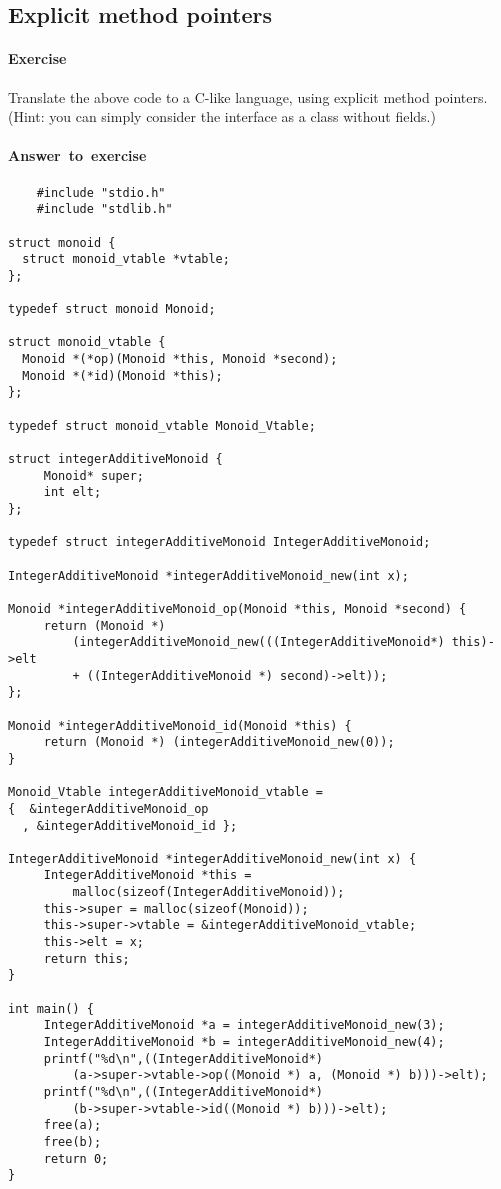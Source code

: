 \documentclass{article}
\newcommand{\percents}[1]{\protect \marginpar[l]{\bf [#1]}}
\newcounter{question}
\newcommand{\question}[1]{
  \addtocounter{question}{1}
  \paragraph{Exercise~\arabic{question}  \percents{#1}}
 }
\newenvironment{ans}{\begin{framed}\paragraph{Answer~to~exercise~\arabic{question}}}{\end{framed}}
\begin{document}
\subsection{Explicit method pointers}

\question{*,@2} Translate the above code to a C-like language, using
explicit method pointers. (Hint: you can simply consider the interface
as a class without fields.)

\begin{ans}
  \begin{verbatim}
    #include "stdio.h"
    #include "stdlib.h"

struct monoid {
  struct monoid_vtable *vtable;
};

typedef struct monoid Monoid;

struct monoid_vtable {
  Monoid *(*op)(Monoid *this, Monoid *second);
  Monoid *(*id)(Monoid *this);
};

typedef struct monoid_vtable Monoid_Vtable;

struct integerAdditiveMonoid {
     Monoid* super;
     int elt;
};

typedef struct integerAdditiveMonoid IntegerAdditiveMonoid;

IntegerAdditiveMonoid *integerAdditiveMonoid_new(int x);

Monoid *integerAdditiveMonoid_op(Monoid *this, Monoid *second) {
     return (Monoid *)
         (integerAdditiveMonoid_new(((IntegerAdditiveMonoid*) this)->elt
         + ((IntegerAdditiveMonoid *) second)->elt));
};

Monoid *integerAdditiveMonoid_id(Monoid *this) {
     return (Monoid *) (integerAdditiveMonoid_new(0));
}

Monoid_Vtable integerAdditiveMonoid_vtable =
{  &integerAdditiveMonoid_op
  , &integerAdditiveMonoid_id };

IntegerAdditiveMonoid *integerAdditiveMonoid_new(int x) {
     IntegerAdditiveMonoid *this =
         malloc(sizeof(IntegerAdditiveMonoid));
     this->super = malloc(sizeof(Monoid));
     this->super->vtable = &integerAdditiveMonoid_vtable;
     this->elt = x;
     return this;
}

int main() {
     IntegerAdditiveMonoid *a = integerAdditiveMonoid_new(3);
     IntegerAdditiveMonoid *b = integerAdditiveMonoid_new(4);
     printf("%d\n",((IntegerAdditiveMonoid*)
         (a->super->vtable->op((Monoid *) a, (Monoid *) b)))->elt);
     printf("%d\n",((IntegerAdditiveMonoid*)
         (b->super->vtable->id((Monoid *) b)))->elt);
     free(a);
     free(b);
     return 0;
}

  \end{verbatim}
\end{ans}
\end{document}

